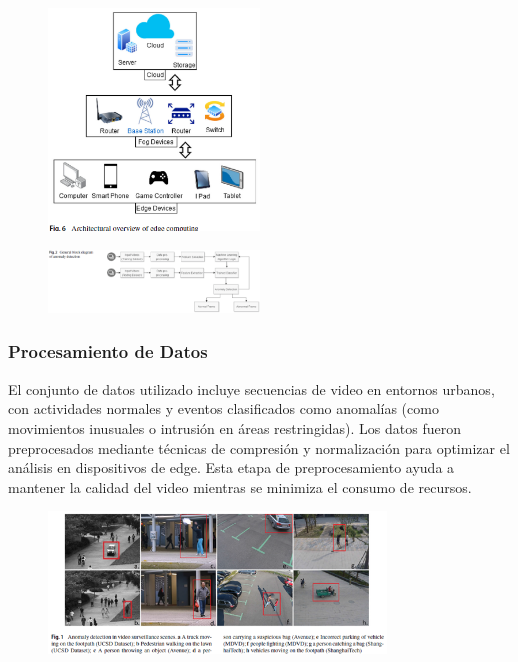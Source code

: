 \begin{figure}[h] %
    \centering
    \includegraphics[width=0.5\textwidth]{4/met4.png} %
    \label{fig:ejemplo} %
\end{figure}

\begin{figure}[h] %
    \centering
    \includegraphics[width=0.5\textwidth]{4/met4.1.png} %
    \label{fig:ejemplo} %
\end{figure}


\subsubsection{Procesamiento de Datos}
El conjunto de datos utilizado incluye secuencias de video en entornos urbanos, con actividades normales y eventos clasificados como anomalías (como movimientos inusuales o intrusión en áreas restringidas). Los datos fueron preprocesados mediante técnicas de compresión y normalización para optimizar el análisis en dispositivos de edge. Esta etapa de preprocesamiento ayuda a mantener la calidad del video mientras se minimiza el consumo de recursos.

\begin{figure}[h] %
    \centering
    \includegraphics[width=0.8\textwidth]{4/pro4.png} %
    \label{fig:ejemplo} %
\end{figure}



